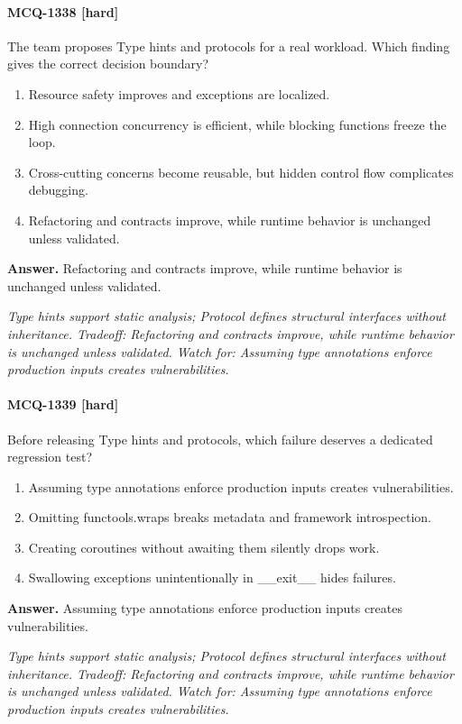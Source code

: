 \paragraph{MCQ-1338 [hard]} The team proposes Type hints and protocols for a real workload. Which finding gives the correct decision boundary?
\begin{enumerate}[label=\Alph*.]
\item Resource safety improves and exceptions are localized.
\item High connection concurrency is efficient, while blocking functions freeze the loop.
\item Cross-cutting concerns become reusable, but hidden control flow complicates debugging.
\item Refactoring and contracts improve, while runtime behavior is unchanged unless validated.
\end{enumerate}
\noindent\textbf{Answer.} Refactoring and contracts improve, while runtime behavior is unchanged unless validated.
\par\textit{Type hints support static analysis; Protocol defines structural interfaces without inheritance. Tradeoff: Refactoring and contracts improve, while runtime behavior is unchanged unless validated. Watch for: Assuming type annotations enforce production inputs creates vulnerabilities.}
\paragraph{MCQ-1339 [hard]} Before releasing Type hints and protocols, which failure deserves a dedicated regression test?
\begin{enumerate}[label=\Alph*.]
\item Assuming type annotations enforce production inputs creates vulnerabilities.
\item Omitting functools.wraps breaks metadata and framework introspection.
\item Creating coroutines without awaiting them silently drops work.
\item Swallowing exceptions unintentionally in \_\_exit\_\_ hides failures.
\end{enumerate}
\noindent\textbf{Answer.} Assuming type annotations enforce production inputs creates vulnerabilities.
\par\textit{Type hints support static analysis; Protocol defines structural interfaces without inheritance. Tradeoff: Refactoring and contracts improve, while runtime behavior is unchanged unless validated. Watch for: Assuming type annotations enforce production inputs creates vulnerabilities.}
